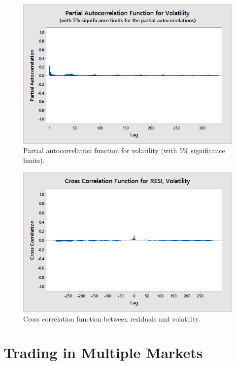         \begin{figure}[!ht]
        \centering
        \includegraphics[width=\textwidth]{chapters/chapter_stat_ts/figures/funvol.png}
        \caption{Partial autocorrelation function for volatility (with 5\% significance limits). \label{fig:funvol}}
        \end{figure}
        
        \begin{figure}[!ht]
        \centering
        \includegraphics[width=\textwidth]{chapters/chapter_stat_ts/figures/resivol.png}
        \caption{Cross correlation function between residuals and volatility. \label{fig:ccresi}}
        \end{figure}



\section{Trading in Multiple Markets}

